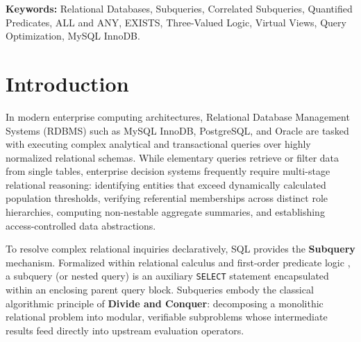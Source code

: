 \documentclass[10pt,twocolumn,letterpaper]{article}
\begin{document}
\vspace{1.0em}
\noindent\textbf{Keywords:} Relational Databases, Subqueries, Correlated Subqueries, Quantified Predicates, ALL and ANY, EXISTS, Three-Valued Logic, Virtual Views, Query Optimization, MySQL InnoDB.
\vspace{1.2em}

\section{Introduction}
\label{sec:intro}

In modern enterprise computing architectures, Relational Database Management Systems (RDBMS) such as MySQL InnoDB, PostgreSQL, and Oracle are tasked with executing complex analytical and transactional queries over highly normalized relational schemas. While elementary queries retrieve or filter data from single tables, enterprise decision systems frequently require multi-stage relational reasoning: identifying entities that exceed dynamically calculated population thresholds, verifying referential memberships across distinct role hierarchies, computing non-nestable aggregate summaries, and establishing access-controlled data abstractions.

To resolve complex relational inquiries declaratively, SQL provides the \textbf{Subquery} mechanism. Formalized within relational calculus and first-order predicate logic \cite{codd1970, date2004}, a subquery (or nested query) is an auxiliary \texttt{SELECT} statement encapsulated within an enclosing parent query block. Subqueries embody the classical algorithmic principle of \textbf{Divide and Conquer}: decomposing a monolithic relational problem into modular, verifiable subproblems whose intermediate results feed directly into upstream evaluation operators.
\end{document}
